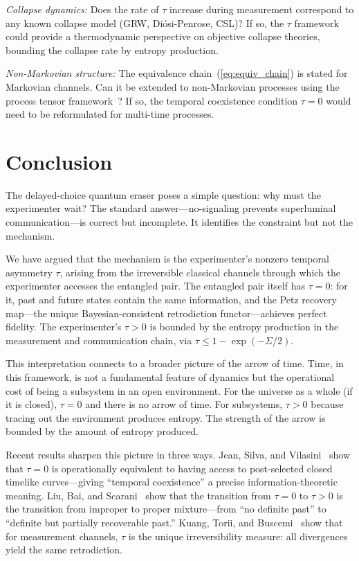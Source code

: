 \documentclass[12pt]{article}
\theoremstyle{definition}
\theoremstyle{remark}
\newcommand{\tauasym}{\tau}
\begin{document}
\emph{Collapse dynamics:}
Does the rate of $\tauasym$ increase during measurement
correspond to any known collapse model (GRW, Di\'osi-Penrose,
CSL)?  If so, the $\tauasym$ framework could provide a
thermodynamic perspective on objective collapse theories,
bounding the collapse rate by entropy production.

\emph{Non-Markovian structure:}
The equivalence chain~(\ref{eq:equiv_chain}) is stated for
Markovian channels.  Can it be extended to non-Markovian
processes using the process tensor
framework~\cite{Pollock2018}?  If so, the temporal
coexistence condition $\tauasym = 0$ would need to be
reformulated for multi-time processes.

\section{Conclusion}
\label{sec:conclusion}

The delayed-choice quantum eraser poses a simple question:
why must the experimenter wait?  The standard answer---no-signaling
prevents superluminal communication---is correct but incomplete.
It identifies the constraint but not the mechanism.

We have argued that the mechanism is the experimenter's nonzero
temporal asymmetry $\tauasym$, arising from the irreversible
classical channels through which the experimenter accesses the
entangled pair.  The entangled pair itself has $\tauasym = 0$:
for it, past and future states contain the same information, and
the Petz recovery map---the unique Bayesian-consistent retrodiction
functor---achieves perfect fidelity.  The experimenter's
$\tauasym > 0$ is bounded by the entropy production in the
measurement and communication chain, via
$\tauasym \leq 1 - \exp(-\Sigma/2)$.

This interpretation connects to a broader picture of the arrow of
time.  Time, in this framework, is not a fundamental feature of
dynamics but the operational cost of being a subsystem in an open
environment.  For the universe as a whole (if it is closed),
$\tauasym = 0$ and there is no arrow of time.  For subsystems,
$\tauasym > 0$ because tracing out the environment produces entropy.
The strength of the arrow is bounded by the amount of entropy
produced.

Recent results sharpen this picture in three ways.
Jean, Silva, and Vilasini~\cite{Jean2025} show that $\tauasym = 0$
is operationally equivalent to having access to post-selected closed
timelike curves---giving ``temporal coexistence'' a precise
information-theoretic meaning.
Liu, Bai, and Scarani~\cite{Liu2026} show that
the transition from $\tauasym = 0$ to $\tauasym > 0$ is the
transition from improper to proper mixture---from ``no definite
past'' to ``definite but partially recoverable past.''
Kuang, Torii, and Buscemi~\cite{Kuang2025} show that for
measurement channels, $\tauasym$ is the unique irreversibility
measure: all divergences yield the same retrodiction.
\end{document}
